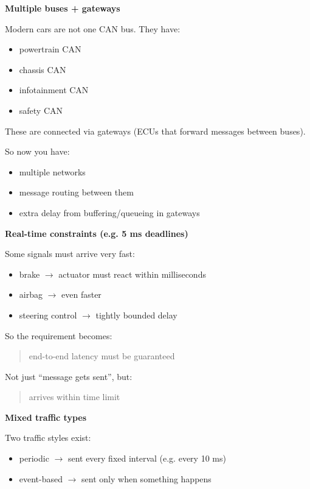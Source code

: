 \begin{mdframed}[backgroundcolor=lightgray, linewidth=0pt, innertopmargin=8pt,
innerbottommargin=8pt]
\textbf{Multiple buses + gateways}

Modern cars are not one CAN bus. They have:
\begin{itemize}
\item powertrain CAN
\item chassis CAN
\item infotainment CAN
\item safety CAN
\end{itemize}

These are connected via gateways (ECUs that forward messages between buses).

So now you have:
\begin{itemize}
\item multiple networks
\item message routing between them
\item extra delay from buffering/queueing in gateways
\end{itemize}
\end{mdframed}

\textbf{Real-time constraints (e.g. 5 ms deadlines)}

Some signals must arrive very fast:
\begin{itemize}
\item brake $\rightarrow$ actuator must react within milliseconds
\item airbag $\rightarrow$ even faster
\item steering control $\rightarrow$ tightly bounded delay
\end{itemize}

So the requirement becomes:
\begin{quote}
end-to-end latency must be guaranteed
\end{quote}

Not just ``message gets sent'', but:
\begin{quote}
arrives within time limit
\end{quote}

\textbf{Mixed traffic types}

Two traffic styles exist:
\begin{itemize}
\item periodic $\rightarrow$ sent every fixed interval (e.g. every 10 ms)
\item event-based $\rightarrow$ sent only when something happens
\end{itemize}

